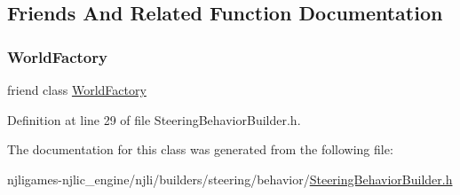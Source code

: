 \subsection{Friends And Related Function Documentation}
\mbox{\label{classnjli_1_1_steering_behavior_builder_acb96ebb09abe8f2a37a915a842babfac}} 
\subsubsection{\texorpdfstring{World\+Factory}{WorldFactory}}
{\footnotesize\ttfamily friend class \mbox{\hyperlink{classnjli_1_1_world_factory}{World\+Factory}}\hspace{0.3cm}{\ttfamily [friend]}}



Definition at line 29 of file Steering\+Behavior\+Builder.\+h.



The documentation for this class was generated from the following file\+:\begin{DoxyCompactItemize}
\item 
njligames-\/njlic\+\_\+engine/njli/builders/steering/behavior/\mbox{\hyperlink{_steering_behavior_builder_8h}{Steering\+Behavior\+Builder.\+h}}\end{DoxyCompactItemize}
